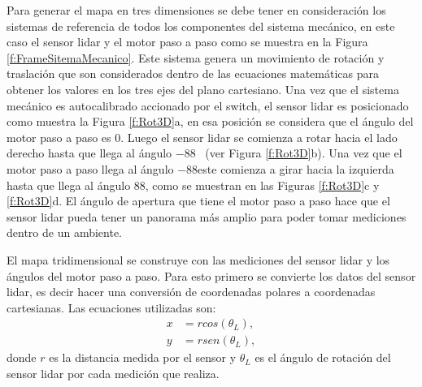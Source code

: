 Para generar el mapa en tres dimensiones se debe tener en consideración los sistemas de referencia 
de todos los componentes del sistema mecánico, en este caso el sensor lidar y el motor paso a paso
como se muestra en la Figura \ref{f:FrameSitemaMecanico}. Este sistema genera un movimiento de rotación
y traslación que son considerados dentro de las ecuaciones matemáticas para obtener los valores en los 
tres ejes del plano cartesiano. Una vez que el sistema mecánico es autocalibrado accionado por el 
switch, el sensor lidar es posicionado como muestra la Figura \ref{f:Rot3D}a, en esa posición se 
considera que el ángulo del motor paso a paso es 0\grad. Luego el sensor lidar se comienza a rotar 
hacia el lado derecho hasta que llega al ángulo $-88$\grad~ (ver Figura \ref{f:Rot3D}b). Una vez que
el motor paso a paso llega al ángulo $-88$\grad este comienza a girar hacia la izquierda hasta 
que llega al ángulo $88$\grad, como se muestran en las Figuras \ref{f:Rot3D}c y \ref{f:Rot3D}d. El 
ángulo de apertura que tiene el motor paso a paso hace que el sensor lidar pueda tener un 
panorama más amplio para poder tomar mediciones dentro de un ambiente.

El mapa tridimensional se construye con las mediciones del sensor lidar y los ángulos del motor paso
a paso. Para esto primero se convierte los datos del sensor lidar, es decir hacer una conversión 
de coordenadas polares a coordenadas cartesianas. Las ecuaciones utilizadas son:
\begin{align*}
	x &= rcos(\theta_{L}), \\
	y &= rsen(\theta_{L}),
\end{align*}
donde $r$ es la distancia medida por el sensor y $\theta_{L}$ es el ángulo de rotación del sensor 
lidar por cada medición que realiza.

